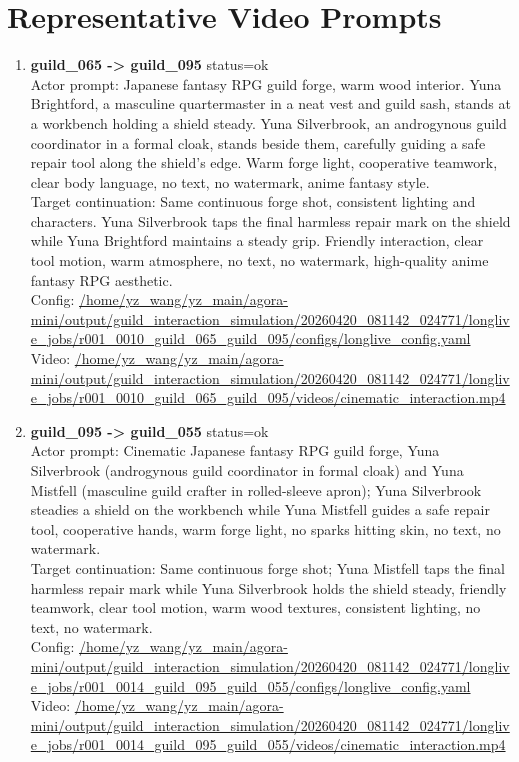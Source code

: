 \documentclass[11pt,a4paper]{article}
\begin{document}
\section{Representative Video Prompts}
\begin{enumerate}
\item \textbf{guild\_065 -> guild\_095} status=ok\\\newline Actor prompt: Japanese fantasy RPG guild forge, warm wood interior. Yuna Brightford, a masculine quartermaster in a neat vest and guild sash, stands at a workbench holding a shield steady. Yuna Silverbrook, an androgynous guild coordinator in a formal cloak, stands beside them, carefully guiding a safe repair tool along the shield's edge. Warm forge light, cooperative teamwork, clear body language, no text, no watermark, anime fantasy style.\\\newline Target continuation: Same continuous forge shot, consistent lighting and characters. Yuna Silverbrook taps the final harmless repair mark on the shield while Yuna Brightford maintains a steady grip. Friendly interaction, clear tool motion, warm atmosphere, no text, no watermark, high-quality anime fantasy RPG aesthetic.\\\newline Config: \url{/home/yz\_wang/yz\_main/agora-mini/output/guild\_interaction\_simulation/20260420\_081142\_024771/longlive\_jobs/r001\_0010\_guild\_065\_guild\_095/configs/longlive\_config.yaml}\\\newline Video: \url{/home/yz\_wang/yz\_main/agora-mini/output/guild\_interaction\_simulation/20260420\_081142\_024771/longlive\_jobs/r001\_0010\_guild\_065\_guild\_095/videos/cinematic\_interaction.mp4}
\item \textbf{guild\_095 -> guild\_055} status=ok\\\newline Actor prompt: Cinematic Japanese fantasy RPG guild forge, Yuna Silverbrook (androgynous guild coordinator in formal cloak) and Yuna Mistfell (masculine guild crafter in rolled-sleeve apron); Yuna Silverbrook steadies a shield on the workbench while Yuna Mistfell guides a safe repair tool, cooperative hands, warm forge light, no sparks hitting skin, no text, no watermark.\\\newline Target continuation: Same continuous forge shot; Yuna Mistfell taps the final harmless repair mark while Yuna Silverbrook holds the shield steady, friendly teamwork, clear tool motion, warm wood textures, consistent lighting, no text, no watermark.\\\newline Config: \url{/home/yz\_wang/yz\_main/agora-mini/output/guild\_interaction\_simulation/20260420\_081142\_024771/longlive\_jobs/r001\_0014\_guild\_095\_guild\_055/configs/longlive\_config.yaml}\\\newline Video: \url{/home/yz\_wang/yz\_main/agora-mini/output/guild\_interaction\_simulation/20260420\_081142\_024771/longlive\_jobs/r001\_0014\_guild\_095\_guild\_055/videos/cinematic\_interaction.mp4}

\end{enumerate}
\end{document}

